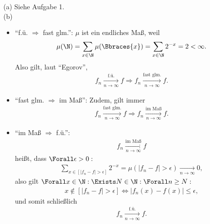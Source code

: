 \begin{solution}

(a) Siehe Aufgabe 1. \\

(b) \phantom{}

\begin{itemize}

  \item \enquote{f.ü. $\Rightarrow$ fast glm.}: $\mu$ ist ein endliches Maß, weil
  \begin{align*}
    \mu(\N)
    =
    \sum_{x \in \N} \mu(\Bbraces{x})
    =
    \sum_{x \in \N} 2^{-x}
    =
    2 < \infty.
  \end{align*}
  Also gilt, laut \enquote{Egorov},
  \begin{align*}
    f_n \xrightarrow[n \to \infty]{\text{f.ü.}} f
    \Rightarrow
    f_n \xrightarrow[n \to \infty]{\text{fast glm.}} f.
  \end{align*}

  \item \enquote{fast glm. $\Rightarrow$ im Maß}: Zudem, gilt immer
  \begin{align*}
    f_n \xrightarrow[n \to \infty]{\text{fast glm.}} f
    \Rightarrow
    f_n \xrightarrow[n \to \infty]{\text{im Maß}} f.
  \end{align*}

  \item \enquote{im Maß $\Rightarrow$ f.ü.}:
  \begin{align*}
    f_n \xrightarrow[n \to \infty]{\text{im Maß}} f
  \end{align*}
  heißt, dass $\Forall \epsilon > 0:$
  \begin{align*}
    \sum_{x \in [|f_n - f| > \epsilon]} 2^{-x}
    =
    \mu(|f_n - f| > \epsilon)
    \xrightarrow[n \to \infty]{} 0,
  \end{align*}
  also gilt $\Forall x \in \N: \Exists N \in \N: \Forall n \geq N:$
  \begin{align*}
    x \notin [|f_n - f| > \epsilon]
    \Leftrightarrow
    |f_n(x) - f(x)| \leq \epsilon,
  \end{align*}
  und somit schließlich
  \begin{align*}
    f_n \xrightarrow[n \to \infty]{\text{f.ü.}} f.
  \end{align*}

\end{itemize}

\end{solution}

